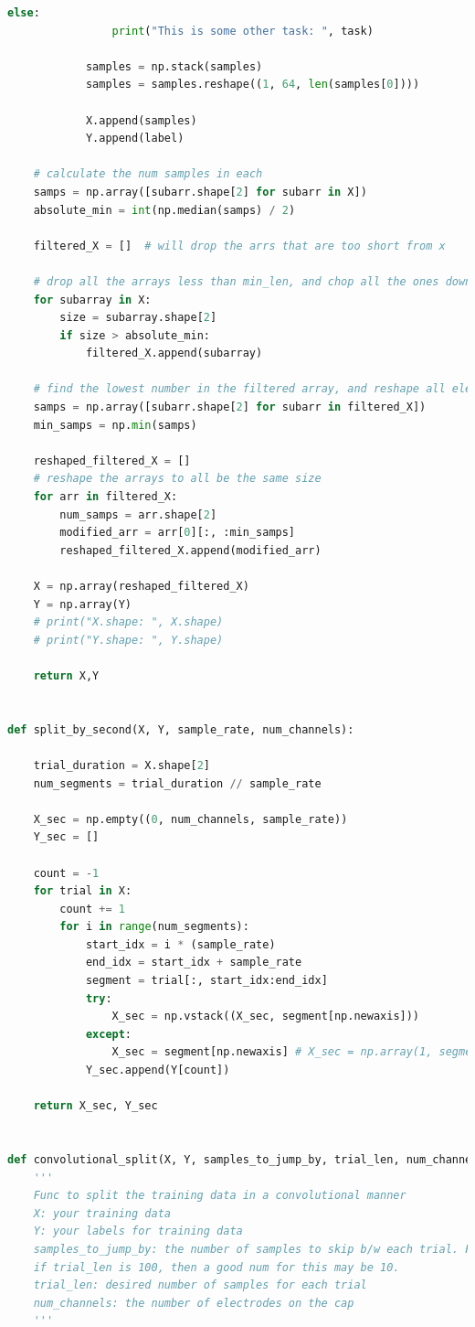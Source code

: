 \documentclass[conference]{IEEEtran}
\begin{document}
\begin{lstlisting}[language=Python, caption=Data Preprocessing Code, label=preprocessing_code]
            else:
                print("This is some other task: ", task)

            samples = np.stack(samples)
            samples = samples.reshape((1, 64, len(samples[0])))

            X.append(samples)
            Y.append(label)

    # calculate the num samples in each
    samps = np.array([subarr.shape[2] for subarr in X])
    absolute_min = int(np.median(samps) / 2)

    filtered_X = []  # will drop the arrs that are too short from x

    # drop all the arrays less than min_len, and chop all the ones down that are longer
    for subarray in X:
        size = subarray.shape[2]
        if size > absolute_min:
            filtered_X.append(subarray)

    # find the lowest number in the filtered array, and reshape all elems to fit
    samps = np.array([subarr.shape[2] for subarr in filtered_X])
    min_samps = np.min(samps)

    reshaped_filtered_X = []
    # reshape the arrays to all be the same size
    for arr in filtered_X:
        num_samps = arr.shape[2]
        modified_arr = arr[0][:, :min_samps]
        reshaped_filtered_X.append(modified_arr)

    X = np.array(reshaped_filtered_X)
    Y = np.array(Y)
    # print("X.shape: ", X.shape)
    # print("Y.shape: ", Y.shape)

    return X,Y


def split_by_second(X, Y, sample_rate, num_channels):
    
    trial_duration = X.shape[2]
    num_segments = trial_duration // sample_rate

    X_sec = np.empty((0, num_channels, sample_rate))
    Y_sec = []

    count = -1
    for trial in X:
        count += 1
        for i in range(num_segments):
            start_idx = i * (sample_rate)
            end_idx = start_idx + sample_rate
            segment = trial[:, start_idx:end_idx]
            try:
                X_sec = np.vstack((X_sec, segment[np.newaxis]))
            except:
                X_sec = segment[np.newaxis] # X_sec = np.array(1, segment[np.newaxis])
            Y_sec.append(Y[count])

    return X_sec, Y_sec


def convolutional_split(X, Y, samples_to_jump_by, trial_len, num_channels):
    '''
    Func to split the training data in a convolutional manner
    X: your training data
    Y: your labels for training data
    samples_to_jump_by: the number of samples to skip b/w each trial. For ex,
    if trial_len is 100, then a good num for this may be 10.
    trial_len: desired number of samples for each trial
    num_channels: the number of electrodes on the cap
    '''


\end{lstlisting}
\end{document}
